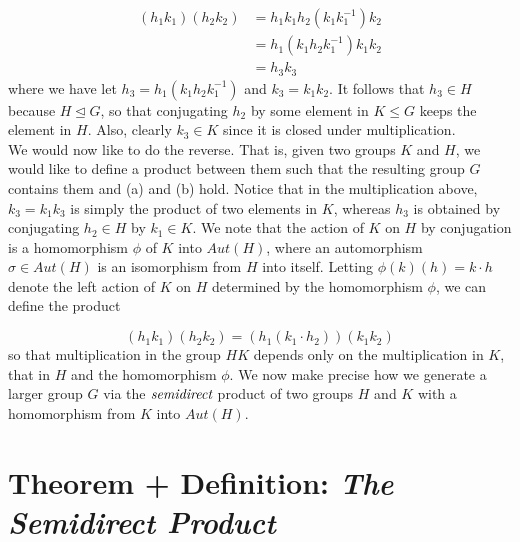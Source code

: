 \documentclass[11pt]{article}
\newcommand{\ns}{\mathrel{\unlhd}}
\begin{document}
\begin{align}
(h_1 k_1) (h_2 k_2) & = h_1 k_1 h_2 (k_1 k_1^{-1}) k_2 \\
& = h_1 (k_1 h_2 k_1^{-1}) k_1 k_2 \\
& = h_3 k_3
\end{align}
where we have let $h_3 = h_1 (k_1 h_2 k_1^{-1})$ and $k_3 = k_1 k_2$. It follows that $h_3 \in H$ because $H \ns G$, so that conjugating $h_2$ by some element in $K \leq G$ keeps the element in $H$. Also, clearly $k_3 \in K$ since it is closed under multiplication. 
\\
\indent
We would now like to do the reverse. That is, given two groups $K$ and $H$, we would like to define a product between them such that the resulting group $G$ contains them and (a) and (b) hold. Notice that in the multiplication above, $k_3 = k_1 k_3$ is simply the product of two elements in $K$, whereas $h_3$ is obtained by conjugating $h_2 \in H$ by $k_1 \in K$. We note that the action of $K$ on $H$ by conjugation is a homomorphism $\phi$ of $K$ into $Aut(H)$, where an automorphism $\sigma \in Aut(H)$ is an isomorphism from $H$ into itself. Letting $\phi(k) (h) = k \cdot h$ denote the left action of $K$ on $H$ determined by the homomorphism $\phi$, we can define the product 

\begin{equation}
(h_1 k_1) (h_2 k_2) = (h_1 (k_1 \cdot h_2)) (k_1 k_2)
\end{equation} 
so that multiplication in the group $HK$ depends only on the multiplication in $K$, that in $H$ and the homomorphism $\phi$. We now make precise how we generate a larger group $G$ via the $\emph{semidirect}$ product of two groups $H$ and $K$ with a homomorphism from $K$ into $Aut(H)$.


\section{Theorem + Definition: \emph{The Semidirect Product}}
 \label{section-theorem+definition}
\end{document}
